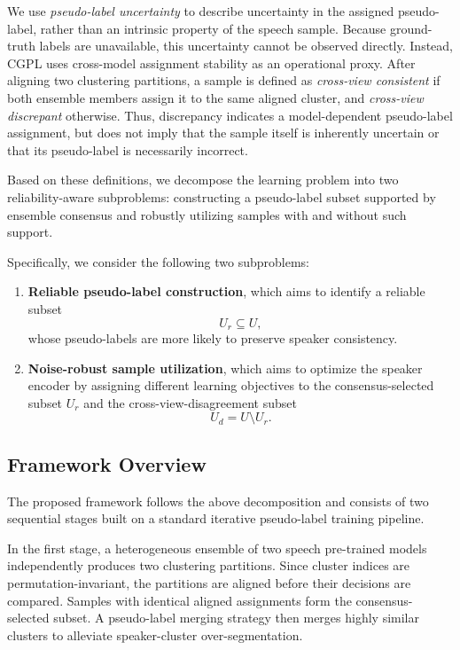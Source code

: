 \documentclass[journal]{IEEEtran}
\begin{document}
We use \emph{pseudo-label uncertainty} to describe uncertainty in the
assigned pseudo-label, rather than an intrinsic property of the speech
sample. Because ground-truth labels are unavailable, this uncertainty cannot
be observed directly. Instead, CGPL uses cross-model assignment stability as
an operational proxy. After aligning two clustering partitions, a sample is
defined as \emph{cross-view consistent} if both ensemble members assign it to
the same aligned cluster, and \emph{cross-view discrepant} otherwise. Thus,
discrepancy indicates a model-dependent pseudo-label assignment, but does not
imply that the sample itself is inherently uncertain or that its pseudo-label
is necessarily incorrect.

Based on these definitions, we decompose the learning problem into two
reliability-aware subproblems: constructing a pseudo-label subset supported
by ensemble consensus and robustly utilizing samples with and without such
support.

Specifically, we consider the following two subproblems:

\begin{enumerate}
    \item \textbf{Reliable pseudo-label construction}, which aims to identify a reliable subset
    \begin{equation}
    {U}_{r}\subseteq{U},
    \end{equation}
    whose pseudo-labels are more likely to preserve speaker consistency.

    \item \textbf{Noise-robust sample utilization}, which aims to optimize the speaker encoder by assigning different learning objectives to the consensus-selected subset ${U}_{r}$ and the cross-view-disagreement subset
    \begin{equation}
    {U}_{d}={U}\setminus{U}_{r}.
    \end{equation}
\end{enumerate}

\subsection{Framework Overview}

The proposed framework follows the above decomposition and consists of two sequential stages built on a standard iterative pseudo-label training pipeline.

In the first stage, a heterogeneous ensemble of two speech pre-trained models independently produces two clustering partitions. Since cluster indices are permutation-invariant, the partitions are aligned before their decisions are compared. Samples with identical aligned assignments form the consensus-selected subset. A pseudo-label merging strategy then merges highly similar clusters to alleviate speaker-cluster over-segmentation.
\end{document}
